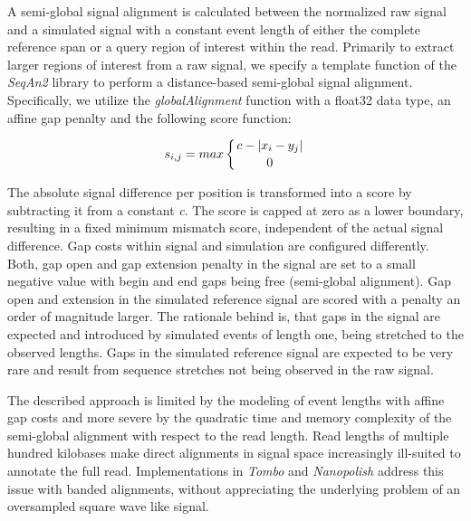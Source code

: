 A semi-global signal alignment is calculated between the normalized raw signal and a simulated signal with a constant event length of either the complete reference span or a query region of interest within the read. Primarily to extract larger regions of interest from a raw signal, we specify a template function of the \textit{SeqAn2} \cite{Reinert2017} library to perform a distance-based semi-global signal alignment. Specifically, we utilize the \textit{globalAlignment} function with a float32 data type, an affine gap penalty and the following score function:

\begin{equation}
s_{i,j} = max \left\lbrace c - \left| x_{i} - y_{j} \right| \atop 0 \right.
\end{equation}

The absolute signal difference per position is transformed into a score by subtracting it from a constant \textit{c}. The score is capped at zero as a lower boundary, resulting in a fixed minimum mismatch score, independent of the actual signal difference.
Gap costs within signal and simulation are configured differently. 
Both, gap open and gap extension penalty in the signal are set to a small negative value with begin and end gaps being free (semi-global alignment). Gap open and extension in the simulated reference signal are scored with a penalty an order of magnitude larger. 
The rationale behind is, that gaps in the signal are expected and introduced by simulated events of length one, being stretched to the observed lengths. Gaps in the simulated reference signal are expected to be very rare and result from sequence stretches not being observed in the raw signal.

The described approach is limited by the modeling of event lengths with affine gap costs and more severe by the quadratic time and memory complexity of the semi-global alignment with respect to the read length. 
Read lengths of multiple hundred kilobases make direct alignments in signal space increasingly ill-suited to annotate the full read. 
Implementations in \textit{Tombo} and \textit{Nanopolish} \cite{Simpson2017, Gamaarachchi2020} address this issue with banded alignments, without appreciating the underlying problem of an oversampled square wave like signal.

